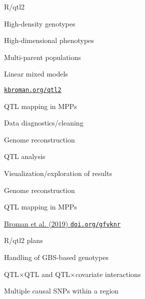 \documentclass[12pt,t,aspectratio=169]{beamer}
\begin{document}
\begin{frame}[c]{R/qtl2}

\vspace*{-16.2mm}

  \vspace{21mm}

  \bbi
\item High-density genotypes
\item High-dimensional phenotypes
\item Multi-parent populations
\item Linear mixed models
  \ei

  \vspace{25mm}

\hfill \href{https://kbroman.org/qtl2}{\small \tt kbroman.org/qtl2}

\end{frame}



\begin{frame}{QTL mapping in MPPs}

  \bbi
\item Data diagnostics/cleaning
\item Genome reconstruction
\item QTL analysis
\item Visualization/exploration of results
  \ei

\end{frame}


\begin{frame}[c]{Genome reconstruction}


\end{frame}




\begin{frame}[c]{QTL mapping in MPPs}

  \bigskip



\hfill
\href{https://doi.org/10.1534/genetics.118.301595}{\scriptsize
  \lolit Broman et al. (2019) {\tt doi.org/gfvknr}}

\end{frame}



\begin{frame}{R/qtl2 plans}

 \bbi
\item Handling of GBS-based genotypes
\item QTL$\times$QTL and QTL$\times$covariate interactions
\item Multiple causal SNPs within a region
 \ei

\end{frame}
\end{document}
